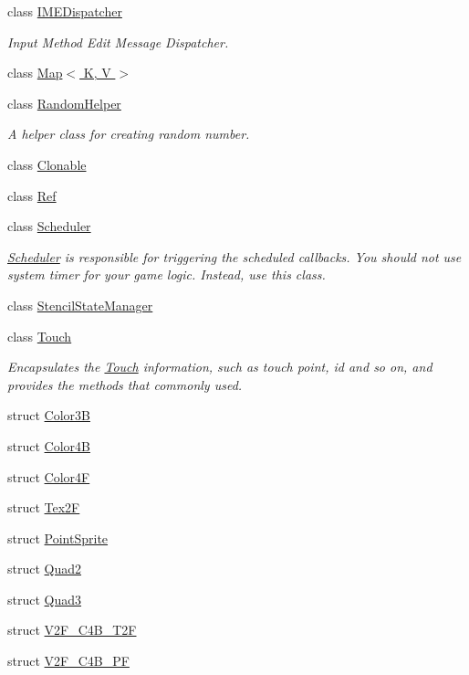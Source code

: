 \begin{DoxyCompactItemize}
class \hyperlink{classIMEDispatcher}{I\+M\+E\+Dispatcher}
\begin{DoxyCompactList}\small\item\em Input Method Edit Message Dispatcher. \end{DoxyCompactList}\item 
class \hyperlink{classMap}{Map$<$ K, V $>$}
\item 
class \hyperlink{classRandomHelper}{Random\+Helper}
\begin{DoxyCompactList}\small\item\em A helper class for creating random number. \end{DoxyCompactList}\item 
class \hyperlink{classClonable}{Clonable}
\item 
class \hyperlink{classRef}{Ref}
\item 
class \hyperlink{classScheduler}{Scheduler}
\begin{DoxyCompactList}\small\item\em \hyperlink{classScheduler}{Scheduler} is responsible for triggering the scheduled callbacks. You should not use system timer for your game logic. Instead, use this class. \end{DoxyCompactList}\item 
class \hyperlink{classStencilStateManager}{Stencil\+State\+Manager}
\item 
class \hyperlink{classTouch}{Touch}
\begin{DoxyCompactList}\small\item\em Encapsulates the \hyperlink{classTouch}{Touch} information, such as touch point, id and so on, and provides the methods that commonly used. \end{DoxyCompactList}\item 
struct \hyperlink{structColor3B}{Color3B}
\item 
struct \hyperlink{structColor4B}{Color4B}
\item 
struct \hyperlink{structColor4F}{Color4F}
\item 
struct \hyperlink{structTex2F}{Tex2F}
\item 
struct \hyperlink{structPointSprite}{Point\+Sprite}
\item 
struct \hyperlink{structQuad2}{Quad2}
\item 
struct \hyperlink{structQuad3}{Quad3}
\item 
struct \hyperlink{structV2F__C4B__T2F}{V2\+F\+\_\+\+C4\+B\+\_\+\+T2F}
\item 
struct \hyperlink{structV2F__C4B__PF}{V2\+F\+\_\+\+C4\+B\+\_\+\+PF}

\end{DoxyCompactItemize}
